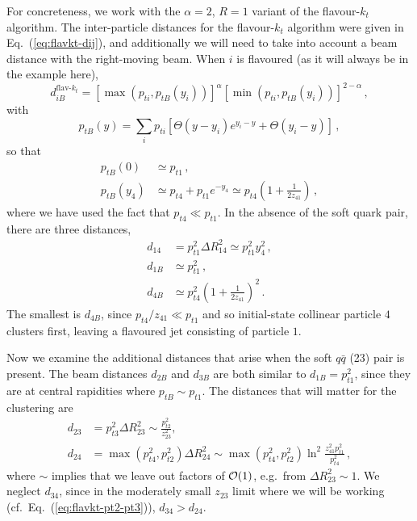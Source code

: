 \documentclass[nofootinbib,twocolumn,preprintnumbers,superscriptaddress,aps]{revtex4-2}
\newcommand{\order}[1]{{\cal O}\!\left(#1\right)}
\begin{document}
For concreteness, we work with the $\alpha=2$, $R=1$ variant of the
flavour-$k_t$ algorithm.
%
The inter-particle distances for the flavour-$k_t$ algorithm were
given in Eq.~(\ref{eq:flavkt-dij}), and additionally we will need to
take into account a beam distance with the right-moving beam.
%
When $i$ is flavoured (as it will always be in the example here),
\begin{equation}
  \label{eq:diB-flavkt-partial}
  d_{iB}^\text{flav-$k_t$} =
  [\max(p_{ti},p_{tB}(y_i))]^\alpha
  [\min(p_{ti},p_{tB}(y_i))]^{2-\alpha}\,,
\end{equation}
with
\begin{equation}
  \label{eq:ktB-flavkt-partial}
  p_{t B}(y) = \sum_i p_{ti}\left[
    \Theta(y - y_i)e^{y_i - y}  + \Theta(y_i - y)
  \right]\,,
\end{equation}
so that
\begin{subequations}
  \begin{align}
    \label{eq:ptB-flavkt}
    p_{t B}(0) &\simeq p_{t1}\,,
    \\
    p_{t B}(y_4) &\simeq p_{t4} + p_{t1} e^{-y_4} \simeq p_{t4}\left(1 +\frac{1}{2z_{41}}\right)\,,
  \end{align}
\end{subequations}
where we have used the fact that $p_{t4} \ll p_{t1}$.
%
In the absence of the soft quark pair, there are three distances,
\begin{subequations}
  \label{eq:dij-flavkt-hard-coll}
  \begin{align}
    d_{14} &= p_{t1}^2 \Delta R_{14}^2 \simeq p_{t1}^2 y_4^2 \,,
    \\
    d_{1B} &\simeq p_{t1}^2 \,,
    \\
    d_{4B} &\simeq p_{t4}^2\left(1 +\frac{1}{2z_{41}}\right)^2\,.
  \end{align}
\end{subequations}
The smallest is $d_{4B}$, since $p_{t4}/z_{41}\ll p_{t1}$ and so
initial-state collinear particle $4$ clusters first, leaving a
flavoured jet consisting of particle $1$.


Now we examine the additional distances that arise when the soft
$q\bar q$ (23) pair is present.
%
The beam distances $d_{2B}$ and $d_{3B}$ are both similar to
$d_{1B} = p_{t1}^2$, since they are at central rapidities where
$p_{tB} \sim p_{t1}$.
%
The distances that will matter for the clustering are 
\begin{subequations}
  \label{eq:dij-flavkt-soft-pair}
  \begin{align}
    d_{23} &= p_{t3}^2 \Delta R_{23}^2 \sim \frac{p_{t2}^2}{z_{23}^2} ,
    \\
    d_{24} &= \max(p_{t4}^2,p_{t2}^2) \Delta R_{24}^2 \sim
             \max(p_{t4}^2,p_{t2}^2) \ln^2 \frac{z_{41}^2p_{t1}^2}{p_{t4}^2}\,,
             \label{eq:d24-flavkt}
  \end{align}
\end{subequations}
where $\sim$ implies that we leave out factors of $\order{1}$, e.g.\
from $\Delta R_{23}^2 \sim 1$.
%
We neglect $d_{34}$, since in the moderately small $z_{23}$ limit where we
will be working (cf.\ Eq.~(\ref{eq:flavkt-pt2-pt3})),
$d_{34} > d_{24}$.
\end{document}
